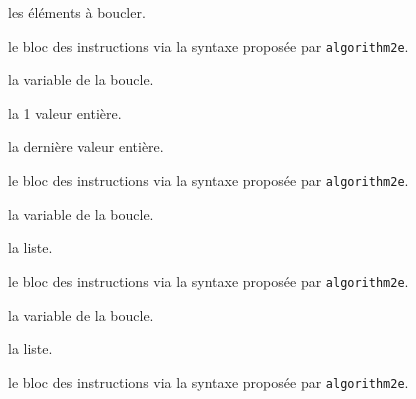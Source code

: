 \documentclass[12pt,a4paper]{article}
\begin{document}


 les éléments à boucler.

 le bloc des instructions via la syntaxe proposée par \verb#algorithm2e#.




\separation






 la variable de la boucle.

 la 1\ier{} valeur entière.

 la dernière valeur entière.

 le bloc des instructions via la syntaxe proposée par \verb#algorithm2e#.




\separation





 la variable de la boucle.

 la liste.

 le bloc des instructions via la syntaxe proposée par \verb#algorithm2e#.




\separation





 la variable de la boucle.

 la liste.

 le bloc des instructions via la syntaxe proposée par \verb#algorithm2e#.




\separation




\extraspace



\extraspace



\extraspace



\extraspace






\separation




\extraspace



\extraspace


\end{document}
